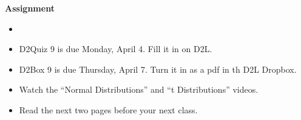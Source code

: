 


\begin{center}
  {\large\bf Assignment}
\end{center}

\begin{itemize}
\item 
\item D2Quiz 9 is due Monday, April 4.  Fill it in on D2L.
\item D2Box 9 is due Thursday, April 7. Turn it in as a pdf in th D2L Dropbox.
\item Watch the ``Normal Distributions'' and ``t Distributions''  videos.
\item Read the next two pages before your next class.
\end{itemize}

